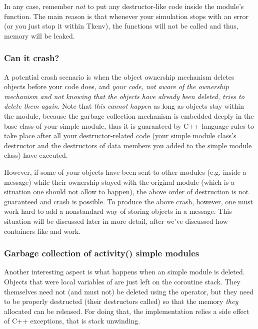 In any case, remember \textit{not} to put any destructor-like
code inside the module's  function. The main reason
is that whenever your simulation stops with an error (or
you just stop it within Tkenv), the  functions
will not be called and thus, memory will be leaked.

\subsubsection{Can it crash?}

A potential crash scenario is when the object ownership
mechanism deletes objects before your code does, and \textit{your code,
not aware of the ownership mechanism and not knowing that the objects
have already been deleted, tries to delete them again}.
Note that \textit{this cannot happen} as long as objects stay within the module,
because the garbage collection mechanism is embedded deeply
in the base class of your simple module, thus it is guaranteed
by C++ language rules to take place after
all your destructor-related code (your simple module class's destructor
and the destructors of data members you added to the simple module class)
have executed.

However, if some of your objects have been sent to other modules
(e.g. inside a message)
while their ownership stayed with the original module (which is a
situation one should not allow to happen), the above order of destruction
is not guaranteed and crash is possible. To produce the above crash, however,
one must work hard to add a nonstandard way of storing objects in a message.
This situation will be discussed later in more detail, after we've discussed
how containers like  and  work.

\subsubsection{Garbage collection of activity() simple modules}

Another interesting aspect is what happens when an 
simple module is deleted. Objects that were local variables
of  are just left on the coroutine stack.
They themselves need not (and must not) be deleted using the
 operator, but they need to be properly destructed
(their destructors called) so that the memory \textit{they} allocated
can be released. For doing that, the implementation relies
a side effect of C++ exceptions, that is stack unwinding.


